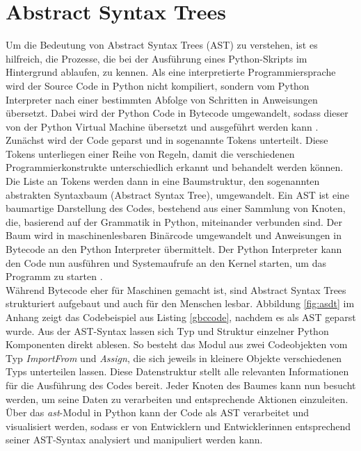 \documentclass[german,bachelor]{swsLeipzig}
\begin{document}
\section{Abstract Syntax Trees}
Um die Bedeutung von Abstract Syntax Trees (AST) zu verstehen, ist es hilfreich, die Prozesse, die
bei der Ausführung eines Python-Skripts im Hintergrund ablaufen, zu kennen.
Als eine interpretierte Programmiersprache wird der Source Code in Python nicht kompiliert, sondern vom
Python Interpreter nach einer bestimmten Abfolge von Schritten in Anweisungen übersetzt.
Dabei wird der Python Code in Bytecode umgewandelt, sodass dieser von der Python Virtual Machine
übersetzt und ausgeführt werden kann \cite[]{aycock1998compiling}. \\

Zunächst wird der Code geparst und in sogenannte Tokens unterteilt.
Diese Tokens unterliegen einer Reihe von Regeln, damit die verschiedenen Programmierkonstrukte unterschiedlich erkannt
und behandelt werden können.
Die Liste an Tokens werden dann in eine Baumstruktur, den sogenannten abstrakten Syntaxbaum (Abstract Syntax Tree), umgewandelt.
Ein AST ist eine baumartige Darstellung des Codes, bestehend aus einer Sammlung von Knoten, die, basierend auf der Grammatik
in Python, miteinander verbunden sind.
Der Baum wird in maschinenlesbaren Binärcode umgewandelt und Anweisungen in Bytecode an den Python Interpreter übermittelt.
Der Python Interpreter kann den Code nun ausführen und Systemaufrufe an den Kernel starten, um das Programm zu starten \cite[]{aycock1998compiling}. \\

Während Bytecode eher für Maschinen gemacht ist, sind Abstract Syntax Trees strukturiert aufgebaut und auch für den Menschen lesbar.
Abbildung \ref{fig:asdt} im Anhang zeigt das Codebeispiel aus Listing \ref{gbccode}, nachdem es als AST geparst wurde.
Aus der AST-Syntax lassen sich Typ und Struktur einzelner Python Komponenten direkt ablesen.
So besteht das Modul aus zwei Codeobjekten vom Typ \textit{ImportFrom} und \textit{Assign}, die sich jeweils in kleinere
Objekte verschiedenen Typs unterteilen lassen.
Diese Datenstruktur stellt alle relevanten Informationen für die Ausführung des Codes bereit.
Jeder Knoten des Baumes kann nun besucht werden, um seine Daten zu verarbeiten und entsprechende Aktionen einzuleiten.
Über das \textit{ast}-Modul in Python kann der Code als AST verarbeitet und visualisiert werden, sodass er von
Entwicklern und Entwicklerinnen entsprechend seiner AST-Syntax analysiert und manipuliert werden kann.\\
\end{document}
